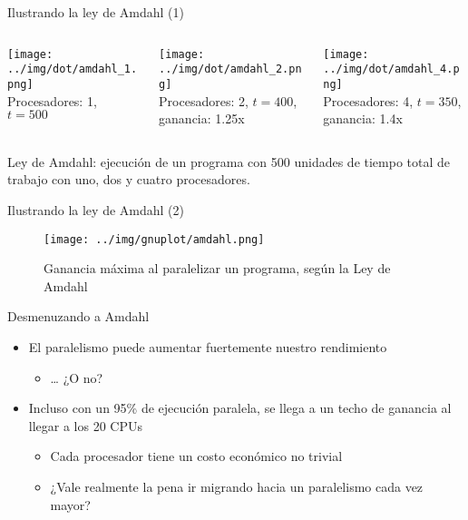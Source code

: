 \documentclass[presentation]{beamer}
\begin{document}
\begin{frame}[label={sec:org966c184}]{Ilustrando la ley de Amdahl (1)}
\begin{latex}
\begin{columns}
\begin{column}{0.3\textwidth}
  \centering
  \texttt{[image: ../img/dot/amdahl\_1.png]} \\
  Procesadores: 1, $t=500$
\end{column}
\begin{column}{0.3\textwidth}
  \centering
  \texttt{[image: ../img/dot/amdahl\_2.png]} \\
  Procesadores: 2, $t=400$, ganancia: 1.25x
\end{column}
\begin{column}{0.3\textwidth}
  \centering
  \texttt{[image: ../img/dot/amdahl\_4.png]} \\
  Procesadores: 4, $t=350$, ganancia: 1.4x
\end{column}
\end{columns}
\end{latex}
\begin{center}
Ley de Amdahl: ejecución de un programa con 500 unidades de tiempo total de trabajo con uno, dos y cuatro procesadores.
\end{center}
\end{frame}

\begin{frame}[label={sec:orgfce9c87}]{Ilustrando la ley de Amdahl (2)}
\begin{figure}[htbp]
\centering
\texttt{[image: ../img/gnuplot/amdahl.png]}
\caption{\label{fig:org5236a4a}Ganancia máxima al paralelizar un programa, según la Ley de Amdahl}
\end{figure}
\end{frame}

\begin{frame}[label={sec:orgd41e9ee}]{Desmenuzando a Amdahl}
\begin{itemize}
\item El paralelismo puede aumentar fuertemente nuestro rendimiento
\begin{itemize}
\item \ldots{} ¿O no?
\end{itemize}
\item Incluso con un 95\% de ejecución paralela, se llega a un techo de
ganancia al llegar a los 20 CPUs
\begin{itemize}
\item Cada procesador tiene un costo económico no trivial
\item ¿Vale realmente la pena ir migrando hacia un paralelismo cada vez
mayor?
\end{itemize}
\end{itemize}
\end{frame}
\end{document}
